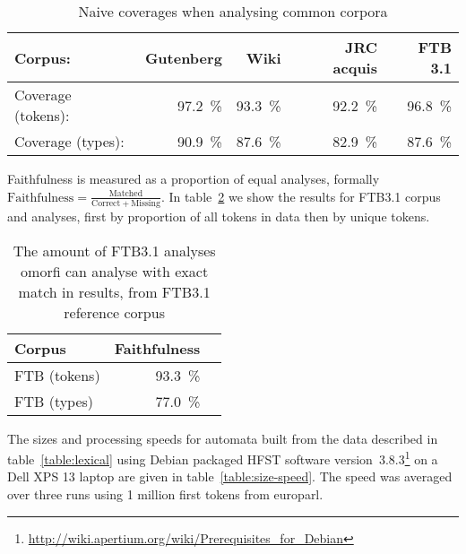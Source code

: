 \documentclass[a4paper,12pt]{article}
\begin{document}
\begin{table}
    \begin{scriptsize}
    \centering
    \begin{tabular}{|l|r|r|r|r|}
        \hline
        Corpus:            & \bf Gutenberg & \bf Wiki & \bf JRC acquis & \bf FTB 3.1 \\
        \hline
        Coverage (tokens): & 97.2~\%       & 93.3~\%  & 92.2~\%        & 96.8~\% \\
        Coverage (types):  & 90.9~\%       & 87.6~\%  & 82.9~\%        & 87.6~\% \\
        \hline
    \end{tabular}
    \caption{Naive coverages when analysing common corpora
    \label{table:coverage}}
  \end{scriptsize}
\end{table}


Faithfulness is measured as a proportion of equal analyses, formally $\mathrm{Faithfulness} =
\frac{\mathrm{Matched}}{\mathrm{Correct} + \mathrm{Missing}}$. In
table~\ref{table:quality} we show the results for FTB3.1 corpus and
analyses, first by proportion of all tokens in data then by unique tokens.

\begin{table}
    \begin{scriptsize}
    \centering
    \begin{tabular}{|l|r|r|}
        \hline
        \bf Corpus & \bf Faithfulness \\
        \hline
        FTB (tokens) & 93.3~\% \\
        FTB (types)  & 77.0~\% \\
        \hline
    \end{tabular}
    \caption{The amount of FTB3.1 analyses omorfi can analyse with exact
    match in results, from FTB3.1 reference corpus\label{table:quality}}
  \end{scriptsize}
\end{table}

The sizes and processing speeds for automata built from the data described in
table~\ref{table:lexical} using Debian packaged HFST software
version~3.8.3\footnote{\url{http://wiki.apertium.org/wiki/Prerequisites_for_Debian}}
on a Dell XPS 13 laptop are given in table~\ref{table:size-speed}. The speed
was averaged over three runs using 1 million first tokens from europarl.
\end{document}
